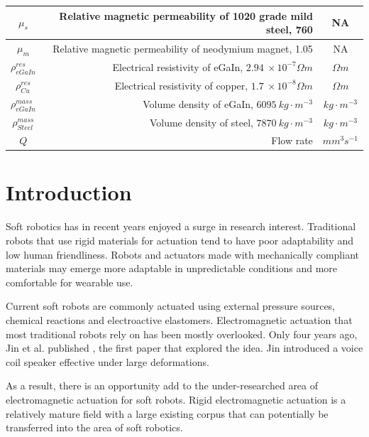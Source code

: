 \documentclass[a4paper,12pt]{article}
\begin{document}
\begin{center}
\begin{tabular}{c | D | c}
        \hline
        $\mu_s$ & Relative magnetic permeability of 1020 grade mild steel, 760 \cite{baartmanMaterialsLibraryFEMM2007} & NA \\
        \hline
        $\mu_m$ & Relative magnetic permeability of neodymium magnet, 1.05 \cite{engineeringtoolboxPermeability2016} & NA \\
        \hline
        $\rho^{res}_{eGaIn}$ & Electrical resistivity of eGaIn, $2.94\ \times10^{-7} \Omega m$ \cite{zrnicResistivitySurfaceTension1969} & $\Omega m$ \\
        \hline
        $\rho^{res}_{Cu}$ & Electrical resistivity of copper, $1.7\ \times10^{-8} \Omega m$ \cite{dickeyEutecticGalliumIndiumEGaIn2008} & $\Omega m$ \\
        \hline
        $\rho^{mass}_{eGaIn}$ & Volume density of eGaIn, $6095\ kg\cdot m^{-3}$\cite{xuEffectOxidationMechanical2012} & $kg\cdot m^{-3}$ \\
        \hline
        $\rho^{mass}_{Steel}$ & Volume density of steel, $7870\ kg\cdot m^{-3}$ \cite{saysAISI1020Carbon2013} & $kg\cdot m^{-3}$ \\
        \hline
        $Q$ & Flow rate & $mm^3s^{-1}$
    \end{tabular}
\end{center}

\newpage

\section{Introduction}

Soft robotics has in recent years enjoyed a surge in research interest. Traditional robots that use rigid materials for actuation tend to have poor adaptability and low human friendliness. Robots and actuators made with mechanically compliant materials may emerge more adaptable in unpredictable conditions and more comfortable for wearable use.

Current soft robots are commonly actuated using external pressure sources, chemical reactions and electroactive elastomers. Electromagnetic actuation that most traditional robots rely on has been mostly overlooked. Only four years ago, Jin et al. published \cite{jinStretchableLoudspeakerUsing2015}, the first paper that explored the idea. Jin introduced a voice coil speaker effective under large deformations.

As a result, there is an opportunity add to the under-researched area of electromagnetic actuation for soft robots. Rigid electromagnetic actuation is a relatively mature field with a large existing corpus that can potentially be transferred into the area of soft robotics.
\end{document}
